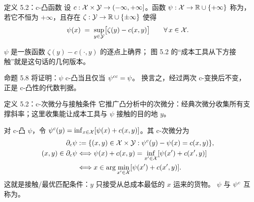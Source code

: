 \begin{frame}{定义 5.2：c-凸函数}
  设 $c:\mathcal{X}\times\mathcal{Y}\to(-\infty,+\infty]$。函数 $\psi:\mathcal{X}\to\mathbb{R}\cup\{+\infty\}$
  称为，若它不恒为 $+\infty$，且存在 $\zeta:\mathcal{Y}\to\mathbb{R}\cup\{\pm\infty\}$ 使得
  \[
    \psi(x) \;=\; \sup_{y\in\mathcal{Y}}\bigl[\zeta(y)-c(x,y)\bigr] \qquad \forall\,x\in\mathcal{X}.
  \]

   $\psi$ 是一族函数 $\zeta(y)-c(\cdot,y)$ 的逐点上确界；
  图 5.2 的“成本工具从下方接触”就是这句话的几何版本。

   命题 5.8 将证明：$\psi$ c-凸当且仅当 ${\psi}^{cc}=\psi$。
  换言之，经过两次 c-变换后不变，正是 c-凸性的代数判据。

\end{frame}

\begin{frame}{定义 5.2：c-次微分与接触条件}
  它推广凸分析中的次微分：经典次微分收集所有支撑斜率；这里收集能让成本工具与 $\psi$ 接触的目的地 $y$。

   对 c-凸 $\psi$，令 ${\psi}^{c}(y)=\inf_{x\in\mathcal{X}}[\psi(x)+c(x,y)]$。其 c-次微分为
  \[
    \begin{aligned}
      \partial_c\psi
      &:= \{(x,y)\in\mathcal{X}\times\mathcal{Y} : {\psi}^{c}(y)-\psi(x)=c(x,y)\},\\
      (x,y)\in\partial_c\psi
      &\Longleftrightarrow
      \psi(x)+c(x,y)=\inf_{x'\in\mathcal{X}}[\psi(x')+c(x',y)]\\
      &\Longleftrightarrow
      x\in\arg\min_{x'\in\mathcal{X}}[\psi(x')+c(x',y)] .
    \end{aligned}
  \]
  这就是接触/最优匹配条件：$y$ 只接受从总成本最低的 $x$ 运来的货物。
  $\psi$ 与 ${\psi}^{c}$ 互称为。

\end{frame}

